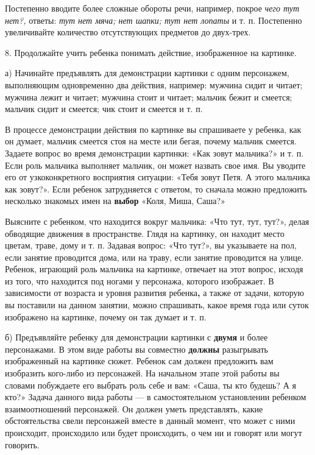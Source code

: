 \documentclass{book}
\renewcommand{\emph}[1]{\textit{#1}}
\begin{document}
Постепенно вводите более сложные обороты речи, например, покрое
\emph{чего тут нет?,} ответы: \emph{тут нет мяча; нет шапки; тут нет
лопаты} и т. п. Постепенно увеличивайте количество отсутствующих
предметов до двух-трех.

8. Продолжайте учить ребенка понимать действие, изображенное на
картинке.

а) Начинайте предъявлять для демонстрации картинки с одним персонажем,
выполняющим одновременно два действия, например: мужчина сидит и читает;
мужчина лежит и читает; мужчина стоит и читает; мальчик бежит и смеется;
мальчик сидит и смеется; чик стоит и смеется и т. п.

В процессе демонстрации действия по картинке вы спрашиваете у ребенка,
как он думает, мальчик смеется стоя на месте или бегая, почему мальчик
смеется. Задаете вопрос во время демонстрации картинки: «Как зовут
мальчика?» и т. п. Если роль мальчика выполняет мальчик, он может
назвать свое имя. Вы уводите его от узкоконкретного восприятия ситуации:
«Тебя зовут Петя. А этого мальчика как зовут?». Если ребенок
затрудняется с ответом, то сначала можно предложить несколько знакомых
имен на \textbf{выбор} «Коля, Миша, Саша?»

Выясните с ребенком, что находится вокруг мальчика: «Что тут, тут,
тут?», делая обводящие движения в пространстве. Глядя на картинку, он
находит место цветам, траве, дому и т. п. Задавая вопрос: «Что тут?», вы
указываете на пол, если занятие проводится дома, или на траву, если
занятие проводится на улице. Ребенок, играющий роль мальчика на
картинке, отвечает на этот вопрос, исходя из того, что находится под
ногами у персонажа, которого изображает. В зависимости от возраста и
уровня развития ребенка\textbf{,} а также от задачи, которую вы
поставили на данном занятии, можно спрашивать, какое время года или
суток изображено на картинке, почему он так думает и т. п.

б) Предъявляйте ребенку для демонстрации картинки с \textbf{двумя} и
более персонажами. В этом виде работы вы совместно \textbf{должны}
разыгрывать изображенный на картинке сюжет. Ребенок сам должен
предложить вам изобразить кого-либо из персонажей. На начальном этапе
этой работы вы словами побуждаете его выбрать роль себе и вам: «Саша, ты
кто будешь? А я кто?» Задача данного вида работы --- в самостоятельном
установлении ребенком взаимоотношений персонажей. Он должен уметь
представлять, какие обстоятельства свели персонажей вместе в данный
момент, что может с ними происходит, происходило или будет происходить,
о чем ни и говорят или могут говорить.
\end{document}
